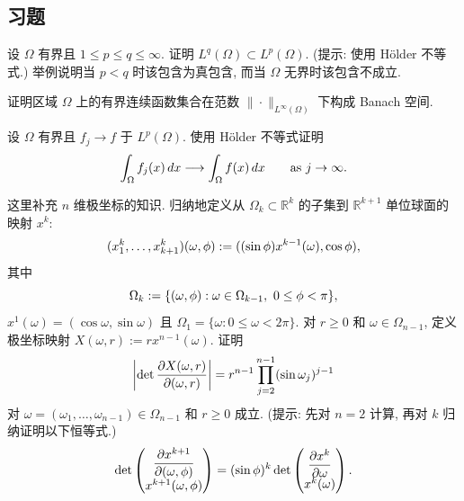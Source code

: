 \subsection*{习题}
\label{sec:ch01-exercises}
\setcounter{exerciseitem}{0}

\begin{MBExercise}
\label{ex:ch01-exercise-01}
设 $\Omega$ 有界且 $1\leq p\leq q\leq\infty$. 证明 $L^q(\Omega)\subset L^p(\Omega)$. (提示: 使用 Hölder 不等式.) 举例说明当 $p<q$ 时该包含为真包含, 而当 $\Omega$ 无界时该包含不成立.
\end{MBExercise}

\begin{MBExercise}
\label{ex:ch01-exercise-02}
证明区域 $\Omega$ 上的有界连续函数集合在范数 $\|\cdot\|_{L^\infty(\Omega)}$ 下构成 Banach 空间.
\end{MBExercise}

\begin{MBExercise}
\label{ex:ch01-exercise-03}
设 $\Omega$ 有界且 $f_j\to f$ 于 $L^p(\Omega)$. 使用 Hölder 不等式证明
\[
\MathBookFormulaID{formula-ch01-exercise-03-integral-limit}
\int_\Omega f_j(x)\,dx\longrightarrow\int_\Omega f(x)\,dx
\qquad\text{as }j\to\infty.
\]
\end{MBExercise}

\begin{MBExercise}
\label{ex:ch01-exercise-04}
这里补充 $n$ 维极坐标的知识. 归纳地定义从 $\Omega_k\subset\mathbb R^k$ 的子集到 $\mathbb R^{k+1}$ 单位球面的映射 $x^k$:
\[
\MathBookFormulaID{formula-ch01-exercise-04-spherical-recursion}
(x_1^k,\ldots,x_{k+1}^k)(\omega,\phi)
:=((\sin\phi)x^{k-1}(\omega),\cos\phi),
\]
其中
\[
\MathBookFormulaID{formula-ch01-exercise-04-angular-domains}
\Omega_k:=\{(\omega,\phi):\omega\in\Omega_{k-1},\ 0\leq\phi<\pi\},
\]
$x^1(\omega)=(\cos\omega,\sin\omega)$ 且 $\Omega_1=\{\omega:0\leq\omega<2\pi\}$. 对 $r\geq0$ 和 $\omega\in\Omega_{n-1}$, 定义极坐标映射 $X(\omega,r):=rx^{n-1}(\omega)$. 证明
\[
\MathBookFormulaID{formula-ch01-exercise-04-polar-jacobian}
\left|\det\frac{\partial X(\omega,r)}{\partial(\omega,r)}\right|
=r^{n-1}\prod_{j=2}^{n-1}(\sin\omega_j)^{j-1}
\]
对 $\omega=(\omega_1,\ldots,\omega_{n-1})\in\Omega_{n-1}$ 和 $r\geq0$ 成立. (提示: 先对 $n=2$ 计算, 再对 $k$ 归纳证明以下恒等式.)
\[
\MathBookFormulaID{formula-ch01-exercise-04-jacobian-recursion}
\det\begin{pmatrix}\dfrac{\partial x^{k+1}}{\partial(\omega,\phi)}\\[2pt]x^{k+1}(\omega,\phi)\end{pmatrix}
=(\sin\phi)^k
\det\begin{pmatrix}\dfrac{\partial x^k}{\partial\omega}\\[2pt]x^k(\omega)\end{pmatrix}.
\]
\end{MBExercise}

